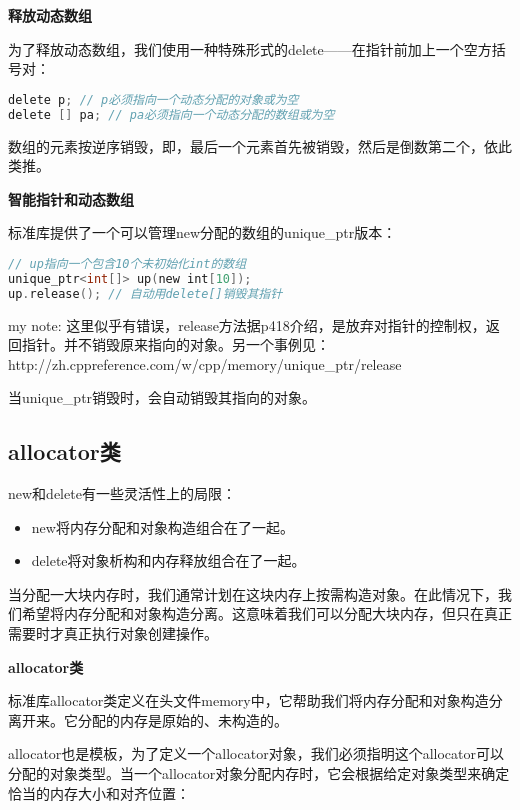 \documentclass[
  a4paper,
  oneside,tablecaptionabove
]{scrbook}
\renewenvironment{quote}{\begin{customblockquote}\list{}{\rightmargin=0em\leftmargin=0em}%
\item\relax\color{blockquote-text}\ignorespaces}{\unskip\unskip\endlist\end{customblockquote}}
\begin{document}
\textbf{释放动态数组}

为了释放动态数组，我们使用一种特殊形式的delete------在指针前加上一个空方括号对：

\begin{lstlisting}[language={C++}]
delete p; // p必须指向一个动态分配的对象或为空
delete [] pa; // pa必须指向一个动态分配的数组或为空
\end{lstlisting}

数组的元素按逆序销毁，即，最后一个元素首先被销毁，然后是倒数第二个，依此类推。

\textbf{智能指针和动态数组}

标准库提供了一个可以管理new分配的数组的unique\_ptr版本：

\begin{lstlisting}[language={C++}]
// up指向一个包含10个未初始化int的数组
unique_ptr<int[]> up(new int[10]);
up.release(); // 自动用delete[]销毁其指针
\end{lstlisting}

\begin{quote}
my note:
这里似乎有错误，release方法据p418介绍，是放弃对指针的控制权，返回指针。并不销毁原来指向的对象。另一个事例见：http://zh.cppreference.com/w/cpp/memory/unique\_ptr/release
\end{quote}

当unique\_ptr销毁时，会自动销毁其指向的对象。

\subsection{allocator类}\label{allocatorux7c7b}

new和delete有一些灵活性上的局限：

\begin{itemize}
\item
  new将内存分配和对象构造组合在了一起。
\item
  delete将对象析构和内存释放组合在了一起。
\end{itemize}

当分配一大块内存时，我们通常计划在这块内存上按需构造对象。在此情况下，我们希望将内存分配和对象构造分离。这意味着我们可以分配大块内存，但只在真正需要时才真正执行对象创建操作。

\textbf{allocator类}

标准库allocator类定义在头文件memory中，它帮助我们将内存分配和对象构造分离开来。它分配的内存是原始的、未构造的。

allocator也是模板，为了定义一个allocator对象，我们必须指明这个allocator可以分配的对象类型。当一个allocator对象分配内存时，它会根据给定对象类型来确定恰当的内存大小和对齐位置：
\end{document}
